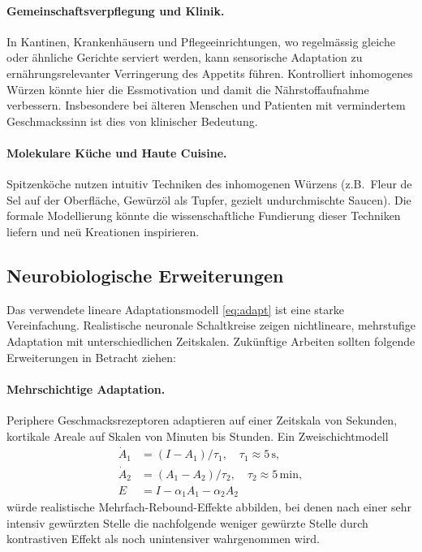 ﻿\documentclass[12pt,a4paper]{article}
\theoremstyle{definition}
\begin{document}
\paragraph{Gemeinschaftsverpflegung und Klinik.}
In Kantinen, Krankenhäusern und Pflegeeinrichtungen, wo regelmässig
gleiche oder ähnliche Gerichte serviert werden, kann sensorische Adaptation
zu ernährungsrelevanter Verringerung des Appetits führen. Kontrolliert
inhomogenes Würzen könnte hier die Essmotivation und damit die
Nährstoffaufnahme verbessern. Insbesondere bei älteren Menschen und
Patienten mit vermindertem Geschmackssinn ist dies von klinischer Bedeutung.

\paragraph{Molekulare Küche und Haute Cuisine.}
Spitzenköche nutzen intuitiv Techniken des inhomogenen Würzens
(z.B.\ Fleur de Sel auf der Oberfläche, Gewürzöl als Tupfer,
gezielt undurchmischte Saucen). Die formale Modellierung könnte
die wissenschaftliche Fundierung dieser Techniken liefern und neü
Kreationen inspirieren.

\subsection{Neurobiologische Erweiterungen}

Das verwendete lineare Adaptationsmodell \eqref{eq:adapt} ist eine
starke Vereinfachung. Realistische neuronale Schaltkreise zeigen
nichtlineare, mehrstufige Adaptation mit unterschiedlichen Zeitskalen.
Zukünftige Arbeiten sollten folgende Erweiterungen in Betracht ziehen:

\paragraph{Mehrschichtige Adaptation.}
Periphere Geschmacksrezeptoren adaptieren auf einer Zeitskala von
Sekunden, kortikale Areale auf Skalen von Minuten bis Stunden. Ein
Zweischichtmodell
\begin{align*}
  \dot{A}_1 &= (I - A_1)/\tau_1, \quad \tau_1 \approx 5\,\text{s}, \\
  \dot{A}_2 &= (A_1 - A_2)/\tau_2, \quad \tau_2 \approx 5\,\text{min}, \\
  E &= I - \alpha_1 A_1 - \alpha_2 A_2
\end{align*}
würde realistische Mehrfach-Rebound-Effekte abbilden, bei denen nach
einer sehr intensiv gewürzten Stelle die nachfolgende weniger gewürzte
Stelle durch kontrastiven Effekt als noch unintensiver wahrgenommen wird.
\end{document}
